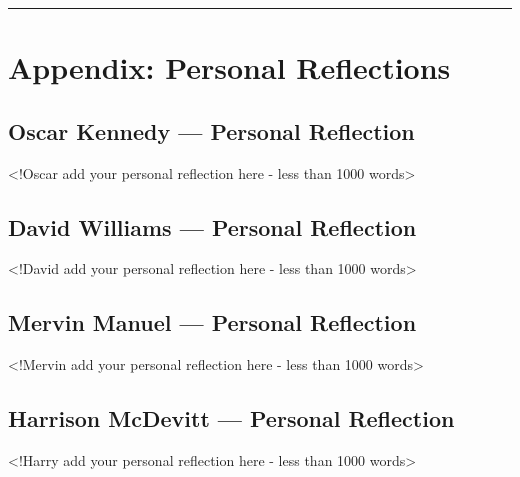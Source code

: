\begin{center}\rule{0.5\linewidth}{0.5pt}\end{center}

\section{Appendix: Personal
Reflections}\label{appendix-personal-reflections}

\subsection{Oscar Kennedy --- Personal
Reflection}\label{oscar-kennedy-personal-reflection}

\textless!Oscar add your personal reflection here - less than 1000
words\textgreater{}

\subsection{David Williams --- Personal
Reflection}\label{david-williams-personal-reflection}

\textless!David add your personal reflection here - less than 1000
words\textgreater{}

\subsection{Mervin Manuel --- Personal
Reflection}\label{mervin-manuel-personal-reflection}

\textless!Mervin add your personal reflection here - less than 1000
words\textgreater{}

\subsection{Harrison McDevitt --- Personal
Reflection}\label{harrison-mcdevitt-personal-reflection}

\textless!Harry add your personal reflection here - less than 1000
words\textgreater{}
